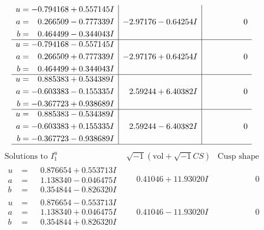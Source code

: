 \documentclass[1p]{elsarticle_modified}
\theoremstyle{definition}
\newcommand{\I}{\sqrt{-1}}
\begin{document}
$$\begin{array}{c|c|c}
\begin{aligned}
u &= -0.794168 + 0.557145 I \\
a &= \phantom{-}0.266509 - 0.777339 I \\
b &= \phantom{-}0.464499 - 0.344043 I\end{aligned}
 & -2.97176 - 0.64254 I & \phantom{-0.000000 } 0 \\ \hline\begin{aligned}
u &= -0.794168 - 0.557145 I \\
a &= \phantom{-}0.266509 + 0.777339 I \\
b &= \phantom{-}0.464499 + 0.344043 I\end{aligned}
 & -2.97176 + 0.64254 I & \phantom{-0.000000 } 0 \\ \hline\begin{aligned}
u &= \phantom{-}0.885383 + 0.534389 I \\
a &= -0.603383 - 0.155335 I \\
b &= -0.367723 + 0.938689 I\end{aligned}
 & \phantom{-}2.59244 + 6.40382 I & \phantom{-0.000000 } 0 \\ \hline\begin{aligned}
u &= \phantom{-}0.885383 - 0.534389 I \\
a &= -0.603383 + 0.155335 I \\
b &= -0.367723 - 0.938689 I\end{aligned}
 & \phantom{-}2.59244 - 6.40382 I & \phantom{-0.000000 } 0\\
 \hline 
 \end{array}$$\newpage$$\begin{array}{c|c|c}  
\text{Solutions to }I^u_{1}& \I (\text{vol} + \sqrt{-1}CS) & \text{Cusp shape}\\
 \hline 
\begin{aligned}
u &= \phantom{-}0.876654 + 0.553713 I \\
a &= \phantom{-}1.138340 - 0.046475 I \\
b &= \phantom{-}0.354844 - 0.826320 I\end{aligned}
 & \phantom{-}0.41046 + 11.93020 I & \phantom{-0.000000 } 0 \\ \hline\begin{aligned}
u &= \phantom{-}0.876654 - 0.553713 I \\
a &= \phantom{-}1.138340 + 0.046475 I \\
b &= \phantom{-}0.354844 + 0.826320 I\end{aligned}
 & \phantom{-}0.41046 - 11.93020 I & \phantom{-0.000000 } 0 \\ \hline\begin{aligned}

\end{aligned}
\end{array}$$
\end{document}
